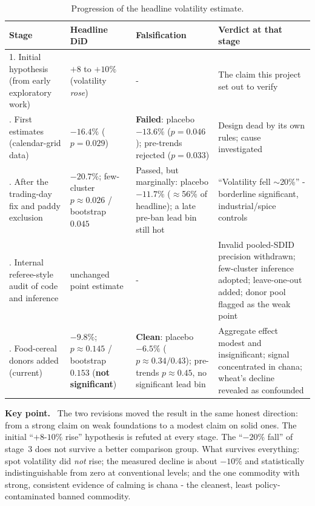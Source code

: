 \documentclass[11pt]{article}
\newenvironment{keybox}
  {\begin{framed}\noindent\textbf{Key point.}\ }
  {\end{framed}}
\begin{document}
\begin{table}[htbp]
\centering\small
\caption{Progression of the headline volatility estimate.}
\label{tab:progression}
\begin{tabular}{p{3.1cm} p{3.3cm} p{3.4cm} p{4.0cm}}
\toprule
Stage & Headline DiD & Falsification & Verdict at that stage \\
\midrule
1. Initial hypothesis (from early exploratory work) & $+8$ to $+10\%$ (volatility \emph{rose}) & - & The claim this project set out to verify \\
\addlinespace
2. First estimates (calendar-grid data) & $-16.4\%$ ($p=0.029$) & \textbf{Failed}: placebo $-13.6\%$ ($p=0.046$); pre-trends rejected ($p=0.033$) & Design dead by its own rules; cause investigated \\
\addlinespace
3. After the trading-day fix and paddy exclusion & $-20.7\%$; few-cluster $p\approx0.026$ / bootstrap $0.045$ & Passed, but marginally: placebo $-11.7\%$ ($\approx$56\% of headline); a late pre-ban lead bin still hot & ``Volatility fell $\sim$20\%'' - borderline significant, industrial/spice controls \\
\addlinespace
4. Internal referee-style audit of code and inference & unchanged point estimate & - & Invalid pooled-SDID precision withdrawn; few-cluster inference adopted; leave-one-out added; donor pool flagged as the weak point \\
\addlinespace
5. Food-cereal donors added (current) & $-9.8\%$; $p\approx0.145$ / bootstrap $0.153$ (\textbf{not significant}) & \textbf{Clean}: placebo $-6.5\%$ ($p\approx0.34/0.43$); pre-trends $p\approx0.45$, no significant lead bin & Aggregate effect modest and insignificant; signal concentrated in chana; wheat's decline revealed as confounded \\
\bottomrule
\end{tabular}
\end{table}

\begin{keybox}
The two revisions moved the result in the same honest direction: from a strong claim on
weak foundations to a modest claim on solid ones. The initial ``$+8$-$10\%$ rise''
hypothesis is refuted at every stage. The ``$-20\%$ fall'' of stage~3 does not survive a
better comparison group. What survives everything: spot volatility did \emph{not} rise;
the measured decline is about $-10\%$ and statistically indistinguishable from zero at
conventional levels; and the one commodity with strong, consistent evidence of calming is
chana - the cleanest, least policy-contaminated banned commodity.
\end{keybox}
\end{document}
